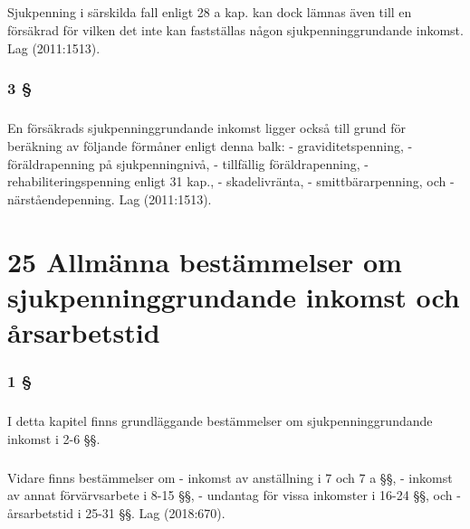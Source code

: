\documentclass[a4paper,notitlepage,openany,10pt]{book}
\begin{document}
\paragraph*{}
Sjukpenning i särskilda fall enligt 28 a kap. kan dock lämnas även till en försäkrad för vilken det inte kan fastställas någon sjukpenninggrundande inkomst.
Lag (2011:1513).
\subsection*{3 §}
\paragraph*{}
En försäkrads sjukpenninggrundande inkomst ligger också till grund för beräkning av följande förmåner enligt denna balk:
\newline - graviditetspenning,
\newline - föräldrapenning på sjukpenningnivå,
\newline - tillfällig föräldrapenning,
\newline - rehabiliteringspenning enligt 31 kap.,
\newline - skadelivränta,
\newline - smittbärarpenning, och
\newline - närståendepenning.
Lag (2011:1513).
\chapter*{25 Allmänna bestämmelser om sjukpenninggrundande inkomst och årsarbetstid}
\subsection*{1 §}
\paragraph*{}
I detta kapitel finns grundläggande bestämmelser om sjukpenninggrundande inkomst i 2-6 §§.
\paragraph*{}
Vidare finns bestämmelser om
\newline - inkomst av anställning i 7 och 7 a §§,
\newline - inkomst av annat förvärvsarbete i 8-15 §§,
\newline - undantag för vissa inkomster i 16-24 §§, och
\newline - årsarbetstid i 25-31 §§.
Lag (2018:670).
\end{document}
